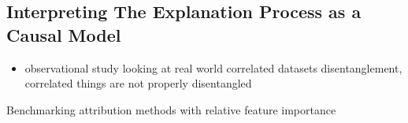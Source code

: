\subsection{Interpreting The Explanation Process as a Causal Model}

\begin{itemize}
    \item observational study looking at real world correlated datasets disentanglement, correlated things are not properly disentangled \cite{Traeuble2021} 
\end{itemize}

 \cite{Yang2019} Benchmarking attribution methods with relative feature importance


